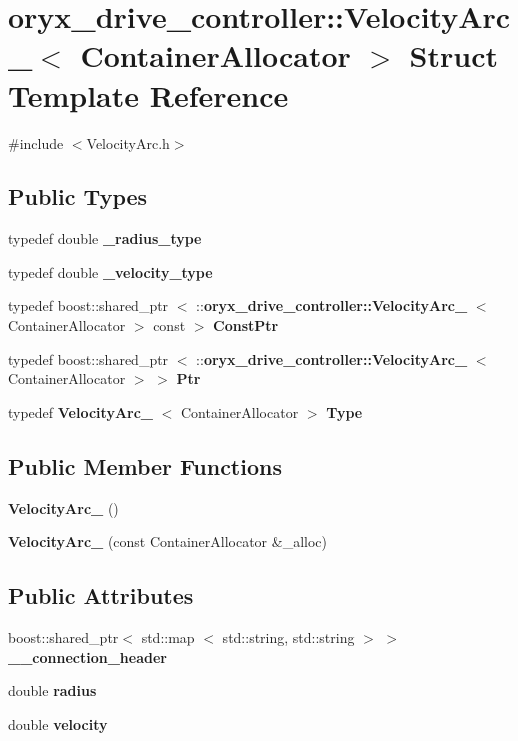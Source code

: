 \section{oryx\-\_\-drive\-\_\-controller\-:\-:\-Velocity\-Arc\-\_\-$<$ \-Container\-Allocator $>$ \-Struct \-Template \-Reference}
\label{structoryx__drive__controller_1_1VelocityArc__}


{\ttfamily \#include $<$\-Velocity\-Arc.\-h$>$}

\subsection*{\-Public \-Types}
\begin{DoxyCompactItemize}
\item 
typedef double {\bf \-\_\-radius\-\_\-type}
\item 
typedef double {\bf \-\_\-velocity\-\_\-type}
\item 
typedef boost\-::shared\-\_\-ptr\*
$<$ \-::{\bf oryx\-\_\-drive\-\_\-controller\-::\-Velocity\-Arc\-\_\-}\*
$<$ \-Container\-Allocator $>$ const  $>$ {\bf \-Const\-Ptr}
\item 
typedef boost\-::shared\-\_\-ptr\*
$<$ \-::{\bf oryx\-\_\-drive\-\_\-controller\-::\-Velocity\-Arc\-\_\-}\*
$<$ \-Container\-Allocator $>$ $>$ {\bf \-Ptr}
\item 
typedef {\bf \-Velocity\-Arc\-\_\-}\*
$<$ \-Container\-Allocator $>$ {\bf \-Type}
\end{DoxyCompactItemize}
\subsection*{\-Public \-Member \-Functions}
\begin{DoxyCompactItemize}
\item 
{\bf \-Velocity\-Arc\-\_\-} ()
\item 
{\bf \-Velocity\-Arc\-\_\-} (const \-Container\-Allocator \&\-\_\-alloc)
\end{DoxyCompactItemize}
\subsection*{\-Public \-Attributes}
\begin{DoxyCompactItemize}
\item 
boost\-::shared\-\_\-ptr$<$ std\-::map\*
$<$ std\-::string, std\-::string $>$ $>$ {\bf \-\_\-\-\_\-connection\-\_\-header}
\item 
double {\bf radius}
\item 
double {\bf velocity}
\end{DoxyCompactItemize}


